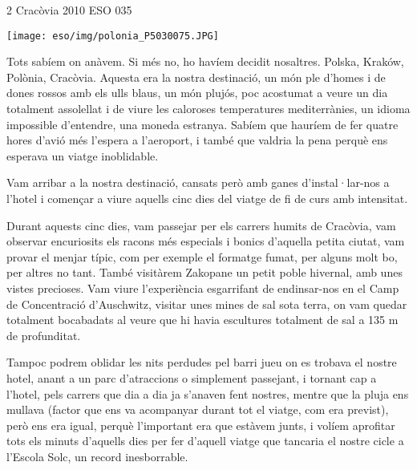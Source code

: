 \begin{news}
{2} %
{Cracòvia 2010}
{}
{ESO}
{035} %

\noindent\texttt{[image: eso/img/polonia\_P5030075.JPG]}

Tots sabíem on anàvem. Si més no, ho havíem decidit nosaltres. Polska, Kraków, Polònia, Cracòvia. Aquesta era la nostra destinació, un món ple d’homes i de dones rossos amb els ulls blaus, un món plujós, poc acostumat a veure un dia totalment assolellat i de viure les caloroses temperatures mediterrànies, un idioma impossible d’entendre, una moneda estranya. Sabíem que hauríem de fer quatre hores d’avió més l’espera a l’aeroport, i també que valdria la pena perquè ens esperava un viatge inoblidable. 

Vam arribar a la nostra destinació, cansats però amb ganes d’instal·lar-nos a l’hotel i començar a viure aquells cinc dies del viatge de fi de curs amb intensitat.

Durant aquests cinc dies, vam passejar per els carrers humits de Cracòvia, vam observar encuriosits els racons més especials i bonics d’aquella petita ciutat, vam provar el menjar típic, com per exemple el formatge fumat, per alguns molt bo, per altres no tant. També visitàrem Zakopane un petit poble hivernal, amb unes vistes precioses. Vam viure l’experiència esgarrifant de endinsar-nos en el Camp de Concentració d’Auschwitz, visitar unes mines de sal sota terra, on vam quedar totalment bocabadats al veure que hi havia escultures totalment de sal a 135 m de profunditat. 


Tampoc podrem oblidar les nits perdudes pel barri jueu on es trobava el nostre hotel, anant a un parc d’atraccions o simplement passejant, i tornant cap a l’hotel, pels carrers que dia a dia ja s’anaven fent nostres, mentre que la pluja ens mullava (factor que ens va acompanyar durant tot el viatge, com era previst), però ens era igual, perquè l’important era que estàvem junts, i volíem aprofitar tots els minuts d’aquells dies per fer d’aquell viatge que tancaria el nostre cicle a l’Escola Solc, un record inesborrable.


\end{news}

\newssep
